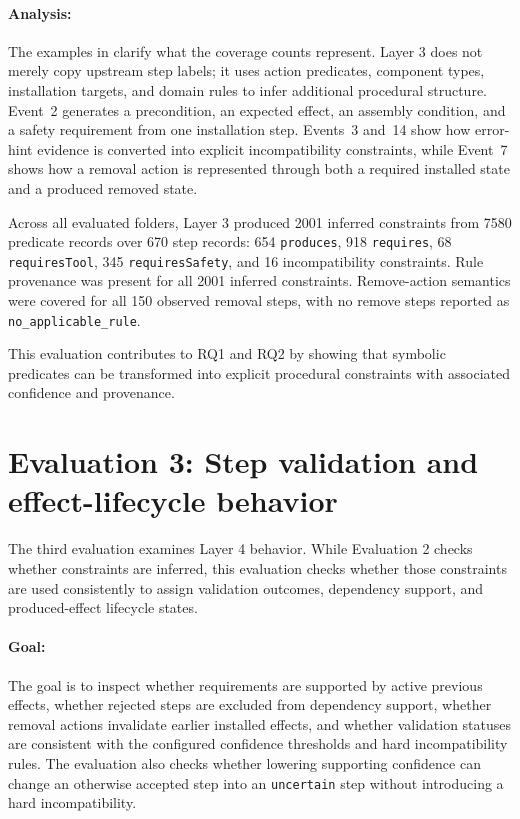 \paragraph{Analysis:}
The examples in  clarify what the
coverage counts represent. Layer 3 does not merely copy upstream step labels; it uses action predicates, component types, installation targets, and domain rules to infer additional procedural structure. Event~2 generates a precondition, an expected effect, an assembly condition, and a safety requirement from one installation step. Events~3 and~14 show how error-hint evidence is converted into
explicit incompatibility constraints, while Event~7 shows how a removal action is represented through both a required installed state and a produced removed state.

Across all evaluated folders, Layer 3 produced 2001 inferred constraints from 7580 predicate records over 670 step records: 654 \texttt{produces}, 918 \texttt{requires}, 68 \texttt{requiresTool}, 345 \texttt{requiresSafety}, and 16 incompatibility constraints. Rule provenance was present for all 2001 inferred constraints. Remove-action semantics were covered for all 150 observed removal steps, with no remove steps reported as \texttt{no\_applicable\_rule}.

This evaluation contributes to RQ1 and RQ2 by showing that symbolic predicates can be transformed into explicit procedural constraints with associated confidence and provenance.


\section{Evaluation 3: Step validation and effect-lifecycle behavior}
\label{sec:evaluation-validation-behavior}

The third evaluation examines Layer 4 behavior. While Evaluation 2 checks whether constraints are inferred, this evaluation checks whether those constraints are used consistently to assign validation outcomes, dependency support, and produced-effect lifecycle states.

\paragraph{Goal:}
The goal is to inspect whether requirements are supported by active previous effects, whether rejected steps are excluded from dependency support, whether removal actions invalidate earlier installed effects, and whether validation statuses are consistent with the configured confidence thresholds and hard incompatibility rules. The evaluation also checks whether lowering supporting confidence can change an otherwise accepted step into an \texttt{uncertain} step without introducing a hard incompatibility.

